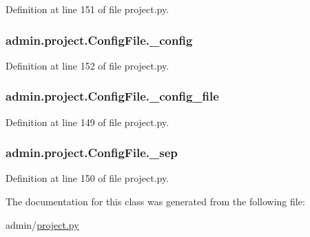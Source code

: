 Definition at line 151 of file project.\-py.

\hypertarget{classadmin_1_1project_1_1ConfigFile_a3e9b17c49825647e05cdbcf536c8a3c3}{
\subsubsection[{\-\_\-config}]{\setlength{\rightskip}{0pt plus 5cm}admin.\-project.\-Config\-File.\-\_\-config\hspace{0.3cm}{\ttfamily [private]}}}\label{classadmin_1_1project_1_1ConfigFile_a3e9b17c49825647e05cdbcf536c8a3c3}


Definition at line 152 of file project.\-py.

\hypertarget{classadmin_1_1project_1_1ConfigFile_a56f108024b6f54bbaef0f880475a1d55}{
\subsubsection[{\-\_\-config\-\_\-file}]{\setlength{\rightskip}{0pt plus 5cm}admin.\-project.\-Config\-File.\-\_\-config\-\_\-file\hspace{0.3cm}{\ttfamily [private]}}}\label{classadmin_1_1project_1_1ConfigFile_a56f108024b6f54bbaef0f880475a1d55}


Definition at line 149 of file project.\-py.

\hypertarget{classadmin_1_1project_1_1ConfigFile_a905065a4ff208d6f2a716f04ec219be9}{
\subsubsection[{\-\_\-sep}]{\setlength{\rightskip}{0pt plus 5cm}admin.\-project.\-Config\-File.\-\_\-sep\hspace{0.3cm}{\ttfamily [private]}}}\label{classadmin_1_1project_1_1ConfigFile_a905065a4ff208d6f2a716f04ec219be9}


Definition at line 150 of file project.\-py.



The documentation for this class was generated from the following file\-:\begin{DoxyCompactItemize}
\item 
admin/\hyperlink{project_8py}{project.\-py}\end{DoxyCompactItemize}
